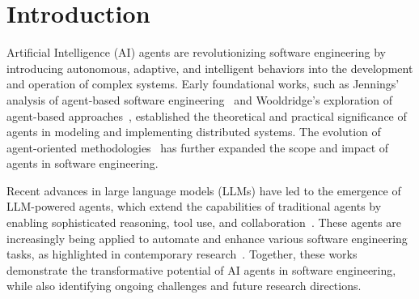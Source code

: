 \section{Introduction}
Artificial Intelligence (AI) agents are revolutionizing software engineering by introducing autonomous, adaptive, and intelligent behaviors into the development and operation of complex systems. Early foundational works, such as Jennings' analysis of agent-based software engineering~\cite{jennings2000agent} and Wooldridge's exploration of agent-based approaches~\cite{wooldridge1997agent}, established the theoretical and practical significance of agents in modeling and implementing distributed systems. The evolution of agent-oriented methodologies~\cite{jennings1999agent} has further expanded the scope and impact of agents in software engineering.

Recent advances in large language models (LLMs) have led to the emergence of LLM-powered agents, which extend the capabilities of traditional agents by enabling sophisticated reasoning, tool use, and collaboration~\cite{liu2024llm}. These agents are increasingly being applied to automate and enhance various software engineering tasks, as highlighted in contemporary research~\cite{suri2023autonomous}. Together, these works demonstrate the transformative potential of AI agents in software engineering, while also identifying ongoing challenges and future research directions.

